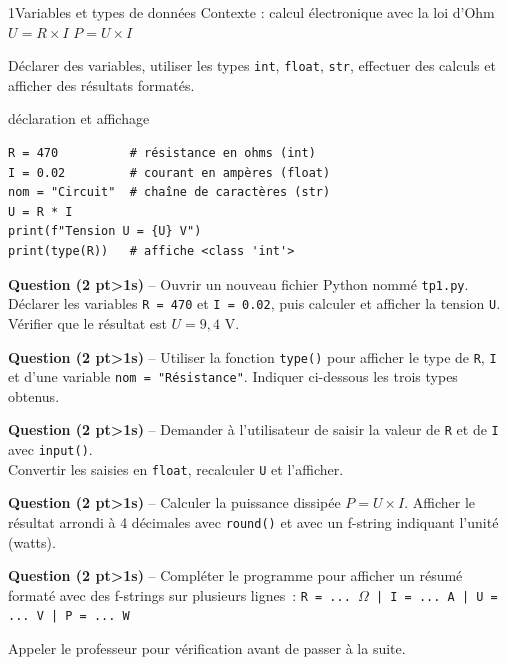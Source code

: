 \documentclass[11pt,a4paper]{article}
\newcommand{\cadreblanc}[1]{%
  \medskip\framebox[\linewidth][c]{\rule{0mm}{#1mm}}\par\medskip}
\newcounter{qnum}
\newcommand{\resetq}{\setcounter{qnum}{0}}
\newcommand{\q}[2]{%
  \stepcounter{qnum}%
  \noindent\textbf{Question \theqnum{} \normalfont(#2 pt\ifnum#2>1s\fi)} -- #1\par\smallskip}
\begin{document}
\clearpage
\resetq
\begin{tptitre}{1}{Variables et types de données}
  Contexte : calcul électronique avec la loi d'Ohm \quad $U = R \times I$ \quad $P = U \times I$
\end{tptitre}

\begin{objectifbox}{}
  Déclarer des variables, utiliser les types \texttt{int}, \texttt{float}, \texttt{str}, effectuer des calculs et afficher des résultats formatés.
\end{objectifbox}

\begin{codebox}{déclaration et affichage}
\begin{lstlisting}
R = 470          # résistance en ohms (int)
I = 0.02         # courant en ampères (float)
nom = "Circuit"  # chaîne de caractères (str)
U = R * I
print(f"Tension U = {U} V")
print(type(R))   # affiche <class 'int'>
\end{lstlisting}
\end{codebox}

\q{Ouvrir un nouveau fichier Python nommé \texttt{tp1.py}. Déclarer les variables \texttt{R = 470} et \texttt{I = 0.02}, puis calculer et afficher la tension \texttt{U}. Vérifier que le résultat est $U = 9{,}4$ V.}{2}
\cadreblanc{20}

\q{Utiliser la fonction \texttt{type()} pour afficher le type de \texttt{R}, \texttt{I} et d'une variable \texttt{nom = "Résistance"}. Indiquer ci-dessous les trois types obtenus.}{2}
\cadreblanc{14}

\q{Demander à l'utilisateur de saisir la valeur de \texttt{R} et de \texttt{I} avec \texttt{input()}.\\Convertir les saisies en \texttt{float}, recalculer \texttt{U} et l'afficher.}{2}
\cadreblanc{22}

\q{Calculer la puissance dissipée $P = U \times I$. Afficher le résultat arrondi à 4 décimales avec \texttt{round()} et avec un f-string indiquant l'unité (watts).}{2}
\cadreblanc{18}

\q{Compléter le programme pour afficher un résumé formaté avec des f-strings sur plusieurs lignes~:
\texttt{R = ... $\Omega$ | I = ... A | U = ... V | P = ... W}}{2}
\cadreblanc{22}

\begin{appelbox}
  \centering Appeler le professeur pour vérification avant de passer à la suite.
\end{appelbox}
\end{document}
